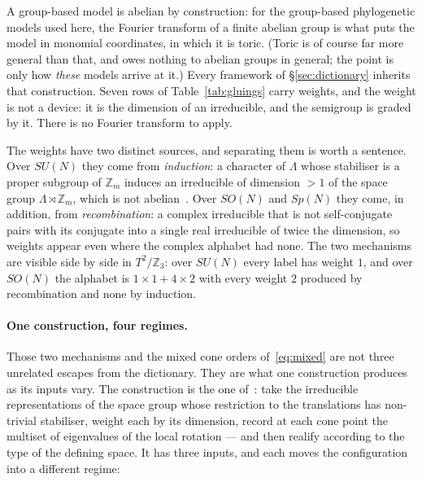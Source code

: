 \documentclass[11pt,a4paper]{article}
\theoremstyle{definition}
\newcommand{\ZZ}{\mathbb{Z}}
\newcommand{\su}[1]{SU(#1)}
\newcommand{\so}[1]{SO(#1)}
\newcommand{\sy}[1]{Sp(#1)}
\begin{document}
A group-based model is abelian by construction: for the group-based phylogenetic models used
here, the Fourier transform of a finite abelian group is what puts the model in monomial
coordinates, in which it is toric. (Toric is of course far more general than that, and owes
nothing to abelian groups in general; the point is only how \emph{these} models arrive at it.)
Every framework of \S\ref{sec:dictionary} inherits that construction. Seven rows of
Table~\ref{tab:gluings} carry weights, and the weight is not a device: it is the dimension of an
irreducible, and the semigroup is graded by it. There is no Fourier transform to apply.

The weights have two distinct sources, and separating them is worth a sentence. Over $\su N$ they
come from \emph{induction}: a character of $\Lambda$ whose stabiliser is a proper subgroup of
$\ZZ_m$ induces an irreducible of dimension $>1$ of the space group $\Lambda\rtimes\ZZ_m$, which is
not abelian~\cite{IXA}. Over $\so N$ and $\sy N$ they come, in addition, from
\emph{recombination}: a complex irreducible that is not self-conjugate pairs with its conjugate into
a single real irreducible of twice the dimension, so weights appear even where the complex alphabet
had none. The two mechanisms are visible side by side in $T^2/\ZZ_3$: over $\su N$ every label has
weight $1$, and over $\so N$ the alphabet is $1{\times}1+4{\times}2$ with every weight $2$ produced
by recombination and none by induction.

\paragraph{One construction, four regimes.} Those two mechanisms and the mixed cone orders
of~\eqref{eq:mixed} are not three unrelated escapes from the dictionary. They are what one
construction produces as its inputs vary. The construction is the one of~\cite{IXA}: take the
irreducible representations of the space group whose restriction to the translations has non-trivial
stabiliser, weight each by its dimension, record at each cone point the multiset of eigenvalues of
the local rotation --- and then realify according to the type of the defining space. It has three
inputs, and each moves the configuration into a different regime:
\end{document}

